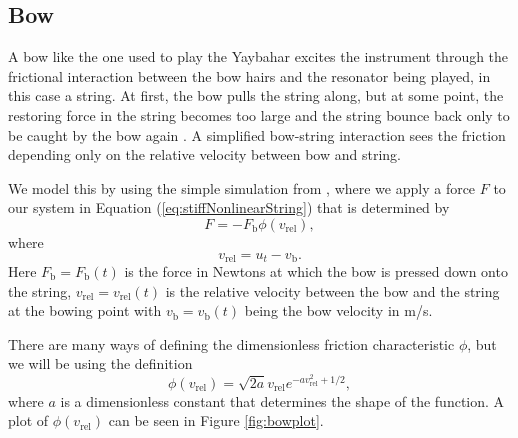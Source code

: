 \documentclass{article}
\begin{document}
\subsection{Bow}
\label{sec:bow}

A bow like the one used to play the Yaybahar excites the instrument through the frictional interaction between the bow hairs and the resonator being played, in this case a string.
At first, the bow pulls the string along, but at some point, the restoring force in the string becomes too large and the string bounce back only to be caught by the bow again \cite[Chapter~2]{fletcher_physics_1998}.
A simplified bow-string interaction sees the friction depending only on the relative velocity between bow and string.

We model this by using the simple simulation from \cite[Chapter~4]{bilbao_numerical_2009}, where we apply a force $F$ to our system in Equation (\ref{eq:stiffNonlinearString}) that is determined by
\begin{equation}
  \label{eq:bowForce}
  F = - F_\text{b} \phi(v_\text{rel}),
\end{equation}
where
\begin{equation}
  v_\text{rel} = u_t - v_\text{b}.
\end{equation}
Here $F_\text{b} = F_\text{b}(t)$ is the force in Newtons at which the bow is pressed down onto the string, $v_\text{rel} = v_\text{rel}(t)$ is the relative velocity between the bow and the string at the bowing point with $v_\text{b} = v_\text{b}(t)$ being the bow velocity in m/s.

There are many ways of defining the dimensionless friction characteristic $\phi$, but we will be using the definition
\begin{equation}
  \label{eq:phi}
  \phi(v_\text{rel}) = \sqrt{2a} v_\text{rel} e^{-a v_\text{rel}^2 + 1/2},
\end{equation}
where $a$ is a dimensionless constant that determines the shape of the function.
A plot of $\phi(v_\text{rel})$ can be seen in Figure \ref{fig:bowplot}.
\end{document}
